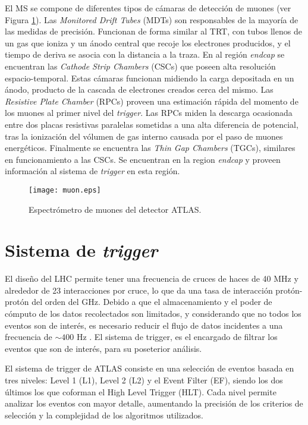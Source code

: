 El MS se compone de diferentes tipos de cámaras de detección de muones (ver Figura \ref{muon}). Las \textit{Monitored Drift Tubes} (MDTs) son responsables de la mayoría de las medidas de precisión. Funcionan de forma similar al TRT, con tubos llenos de un gas que ioniza y un ánodo central que recoje los electrones producidos, y el tiempo de deriva se asocia con la distancia a la traza. En al región \textit{endcap} se encuentran las \textit{Cathode Strip Chambers} (CSCs) que poseen alta resolución espacio-temporal. Estas cámaras funcionan midiendo la carga depositada en un ánodo, producto de la cascada de electrones creados cerca del mismo. Las \textit{Resistive Plate Chamber} (RPCs) proveen una estimación rápida del momento de los muones al primer nivel del \textit{trigger}. Las RPCs miden la descarga ocasionada entre dos placas resistivas paralelas sometidas a una alta diferencia de potencial, tras la ionización del vólumen de gas interno causada por el paso de muones energéticos. Finalmente se encuentra las \textit{Thin Gap Chambers} (TGCs), similares en funcionamiento a las CSCs. Se encuentran en la region \textit{endcap} y proveen información al sistema de \textit{trigger} en esta región.


\begin{figure}
\centering
\texttt{[image: muon.eps]}
\caption{Espectrómetro de muones del detector ATLAS.}
\label{muon}
\end{figure}



\section{Sistema de \textit{trigger}}

El diseño del LHC permite tener una frecuencia de cruces de haces de 40 MHz y alrededor de 23 interacciones por cruce, lo que da una tasa de interacción protón-protón del orden del GHz. Debido a que el almacenamiento y el poder de cómputo de los datos recolectados son limitados, y considerando que no todos los eventos son de interés, es necesario reducir el flujo de datos incidentes a una frecuencia de $\sim 400$ Hz \cite{PERF-2011-02}. El sistema de trigger, es el encargado de filtrar los eventos que son de interés, para su poseterior análisis. 

El sistema de trigger de ATLAS consiste en una selección de eventos basada en tres niveles: Level 1 (L1), Level 2 (L2) y el Event Filter (EF), siendo los dos últimos los que coforman el High Level Trigger (HLT). Cada nivel permite analizar los eventos con mayor detalle, aumentando la precisión de los criterios de selección y la complejidad de los algoritmos utilizados.

